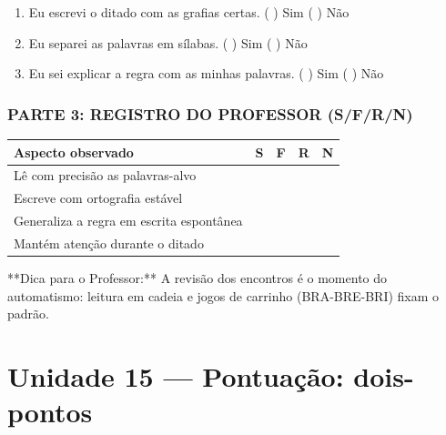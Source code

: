 \begin{exercicio}
\begin{enumerate}[label=\alph*)]
  \item Eu escrevi o ditado com as grafias certas.  \quad ( ) Sim   ( ) Não

  \item Eu separei as palavras em sílabas.  \quad ( ) Sim   ( ) Não

  \item Eu sei explicar a regra com as minhas palavras.  \quad ( ) Sim   ( ) Não

\end{enumerate}

\subsection*{PARTE 3: REGISTRO DO PROFESSOR (S/F/R/N)}

\begin{center}
\renewcommand{\arraystretch}{1.4}
\begin{tabular}{@{}p{9cm}cccc@{}}
\toprule
Aspecto observado & S & F & R & N \\
\midrule
Lê com precisão as palavras-alvo & & & & \\
Escreve com ortografia estável & & & & \\
Generaliza a regra em escrita espontânea & & & & \\
Mantém atenção durante o ditado & & & & \\
\bottomrule\end{tabular}\end{center}

\end{exercicio}

\begin{dica}
**Dica para o Professor:** A revisão dos encontros é o momento do automatismo: leitura em cadeia e jogos de carrinho (BRA-BRE-BRI) fixam o padrão.
\end{dica}


\chapter{Unidade 15 --- Pontuação: dois-pontos}



